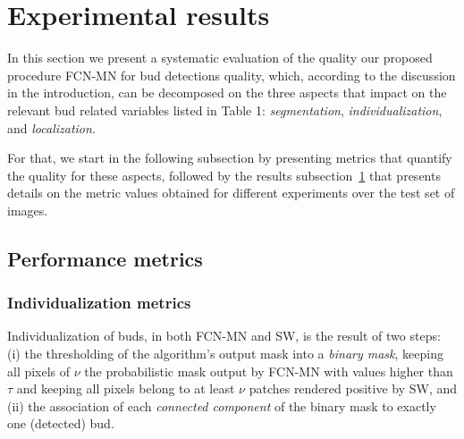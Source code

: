 \documentclass[a4paper,authoryear,review]{elsarticle}
\begin{document}
\section{Experimental results} \label{sec:results}

In this section we present a systematic evaluation of the quality our proposed procedure FCN-MN for bud detections quality, which, 
%
according to the discussion in the introduction, can be decomposed on the three aspects that impact on the relevant bud related variables listed in Table 1: \emph{segmentation}, \emph{individualization}, and \emph{localization}. 

%
For that, we start in the following subsection by presenting metrics that quantify the quality for these aspects, followed by the results   subsection~\ref{sec:results} that presents details on the metric values obtained for different experiments over the test set of images. 


\subsection{Performance metrics}





\subsubsection{Individualization metrics } \label{subsec:detectmetrics}

Individualization of buds, in both FCN-MN and SW, is the result of two steps: (i)  the thresholding of the algorithm’s output mask into a \emph{binary mask}, keeping all pixels of $\nu$ the probabilistic mask output by FCN-MN with values higher than $\tau$ and keeping all pixels belong to at least $\nu$ patches rendered positive by SW, and (ii) the association of each \emph{connected component} of the binary mask to exactly one (detected) bud. 
\end{document}
